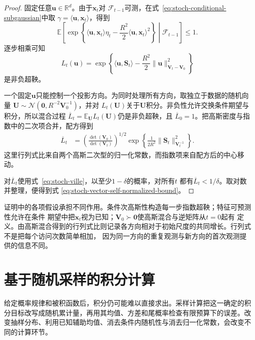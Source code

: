 \begin{proof}
固定任意$\bm{u}\in\mathbb{R}^d$。由于$\bm{x}_t$对
$\mathcal{F}_{t-1}$可测，在式~\eqref{eq:stoch-conditional-subgaussian}中取
$\gamma=\langle\bm{u},\bm{x}_t\rangle$，得到
\[
  \mathbb{E}\!\left[
    \exp\left\{
      \langle\bm{u},\bm{x}_t\rangle\eta_t
      -\frac{R^2}{2}
       \langle\bm{u},\bm{x}_t\rangle^2
    \right\}
    \middle|\mathcal{F}_{t-1}
  \right]
  \leq1.
  \]
逐步相乘可知
\[
  L_t(\bm{u})
  =
  \exp\left\{
    \langle\bm{u},\bm{S}_t\rangle
    -\frac{R^2}{2}
     \lVert\bm{u}\rVert_{\bm{V}_t-\bm{V}_0}^2
  \right\}
\]
是非负超鞅。

一个固定$\bm{u}$只能控制一个投影方向。为同时处理所有方向，取独立于数据的随机向量
$\bm{U}\sim\mathcal{N}(\bm{0},R^{-2}\bm{V}_0^{-1})$，并对
$L_t(\bm{U})$关于$\bm{U}$积分。非负性允许交换条件期望与积分，所以混合过程
$\overline L_t=\mathbb{E}_{\bm{U}}L_t(\bm{U})$仍是非负超鞅，且
$\overline L_0=1$。把高斯密度与指数中的二次项合并，配方得到
\begin{align*}
  \overline L_t
  &=
  \left(
    \frac{\det(\bm{V}_0)}
         {\det(\bm{V}_t)}
  \right)^{1/2}
  \exp\left\{
    \frac{1}{2R^2}
    \lVert\bm{S}_t\rVert_{\bm{V}_t^{-1}}^2
  \right\}.
\end{align*}
这里行列式比来自两个高斯二次型的归一化常数，而指数项来自配方后的中心移动。

对$\overline L_t$使用式~\eqref{eq:stoch-ville}，以至少$1-\delta$的概率，对所有$t$
都有$\overline L_t<1/\delta$。取对数并整理，便得到式
\eqref{eq:stoch-vector-self-normalized-bound}。
\end{proof}

证明中的各项假设承担不同作用。条件次高斯性构造每一步指数超鞅；特征可预测性允许在条件
期望中把$\bm{x}_t$视为已知；$\bm{V}_0\succ\bm{0}$使高斯混合与逆矩阵从$t=0$起有
定义。由高斯混合得到的行列式比则记录各方向相对于初始尺度的共同增长。行列式不是把每个访问次数简单相加，
因为同一方向的重复观测与新方向的首次观测提供的信息不同。


\section{基于随机采样的积分计算}
\label{sec:stoch-sampling-integrals}
给定概率规律和被积函数后，积分仍可能难以直接求出。采样计算把这一确定的积分目标改写成随机累计量，再用其均值、方差和尾概率检查有限预算下的误差。改变抽样分布、利用已知辅助均值、消去条件内随机性与消去归一化常数，会改变不同的计算环节。

